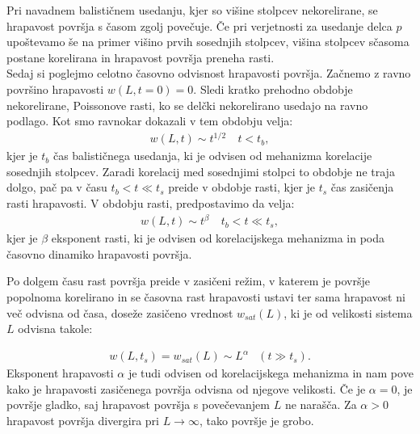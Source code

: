 \documentclass[a4paper, twoside, 12pt]{book}
\begin{document}
Pri navadnem balističnem usedanju, kjer so višine stolpcev nekorelirane, se hrapavost površja s časom zgolj povečuje. Če pri verjetnosti za usedanje delca $p$ upoštevamo še na primer višino prvih sosednjih stolpcev, višina stolpcev sčasoma postane korelirana in hrapavost površja preneha rasti. \\
Sedaj si poglejmo celotno časovno odvisnost hrapavosti površja. Začnemo z ravno površino hrapavosti $w(L,t=0)=0$. Sledi kratko prehodno obdobje nekorelirane, Poissonove rasti, ko se delčki nekorelirano usedajo na ravno podlago. Kot smo ravnokar dokazali v tem obdobju velja:
\begin{equation}
  \begin{array}{lr} w(L,t) \sim t^{1/2} & \ t < t_b, \end{array}
\end{equation}
kjer je $t_b$ čas balističnega usedanja, ki je odvisen od mehanizma korelacije sosednjih stolpcev.
Zaradi korelacij med sosednjimi stolpci to obdobje ne traja dolgo, pač pa v času $t_b < t \ll t_s$ preide v obdobje rasti, kjer je $t_s$ čas zasičenja rasti hrapavosti. V obdobju rasti, predpostavimo da velja:
  \begin{equation}
    \begin{array}{lr} w(L,t) \sim t^\beta  & \ t_b < t \ll t_s, \end{array}
    \label{beta}
  \end{equation}
kjer je $\beta$ eksponent rasti, ki je odvisen od korelacijskega mehanizma in poda časovno dinamiko hrapavosti površja.

Po dolgem času rast površja preide v zasičeni režim, v katerem je površje popolnoma korelirano in se časovna rast hrapavosti ustavi ter sama hrapavost ni več odvisna od časa, doseže zasičeno vrednost $w_{sat}(L)$, ki je od velikosti sistema $L$ odvisna takole:

  \begin{equation}
    \begin{array}{lr} w(L,t_s) = w_{sat}(L) \sim L^\alpha & (t \gg t_s). \end{array}
    \label{alfa}
  \end{equation}
Eksponent hrapavosti $\alpha$ je tudi odvisen od korelacijskega mehanizma in nam pove kako je hrapavosti zasičenega površja odvisna od njegove velikosti. Če je $\alpha = 0$, je površje gladko, saj hrapavost površja s povečevanjem $L$ ne narašča. Za $\alpha > 0$ hrapavost površja divergira pri $L \rightarrow \infty$, tako površje je grobo. \cite{krim1993roughness}
\end{document}
